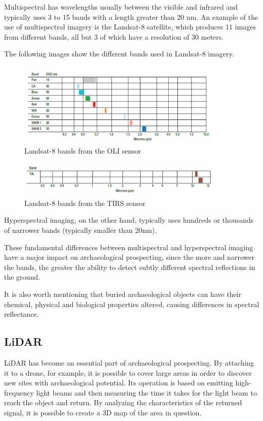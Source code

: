 Multispectral has wavelengths usually between the visible and infrared and typically uses 3 to 15 bands with a length greater than 20 nm. An example of the use of multispectral imagery is the Landsat-8 satellite, which produces 11 images from different bands, all but 3 of which have a resolution of 30 meters.

The following images show the different bands used in Landsat-8 imagery.

\begin{figure}[H]
\centering
\includegraphics[width=10cm]{images/landsat1.png}
\caption{Landsat-8 bands from the OLI sensor}
\end{figure}

\begin{figure}[H]
\centering
\includegraphics[width=10cm]{images/landsat2.png}
\caption{Landsat-8 bands from the TIRS sensor}
\end{figure}

Hyperspectral imaging, on the other hand, typically uses hundreds or thousands of narrower bands (typically smaller than 20nm).

These fundamental differences between multispectral and hyperspectral imaging have a major impact on archaeological prospecting, since the more and narrower the bands, the greater the ability to detect subtly different spectral reflections in the ground.

It is also worth mentioning that buried archaeological objects can have their chemical, physical and biological properties altered, causing differences in spectral reflectance.


\subsection{LiDAR}
LiDAR has become an essential part of archaeological prospecting. By attaching it to a drone, for example, it is possible to cover large areas in order to discover new sites with archaeological potential.  Its operation is based on emitting high-frequency light beams and then measuring the time it takes for the light beam to reach the object and return.
By analyzing the characteristics of the returned signal, it is possible to create a 3D map of the area in question.

